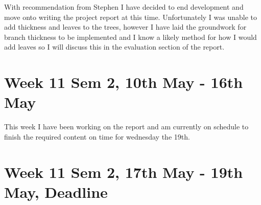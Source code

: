 \documentclass[11pt]{article}
\begin{document}
With recommendation from Stephen I have decided to end development and move onto writing the 
project report at this time. Unfortunately I was unable to add thickness and leaves to the 
trees, however I have laid the groundwork for branch thickness to be implemented and I know 
a likely method for how I would add leaves so I will discuss this in the evaluation section of 
the report.

\section*{Week 11 Sem 2, 10th May - 16th May}
This week I have been working on the report and am currently on schedule to finish the required 
content on time for wednesday the 19th.

\section*{Week 11 Sem 2, 17th May - 19th May, Deadline}
\end{document}
